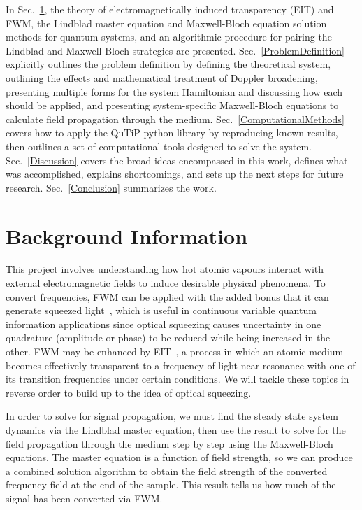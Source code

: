 \documentclass[aps,pra,showpacs,amsmath,amssymb,nofootinbib,longbibliography,superscriptaddress
]{revtex4-1}
\theoremstyle{definition}
\theoremstyle{remark}
\newcommand{\0}{\hat{0}}
\begin{document}
In Sec.~\ref{Background}, the theory of electromagnetically induced transparency (EIT) and FWM, the Lindblad master equation and Maxwell-Bloch equation solution methods for quantum systems, and an algorithmic procedure for pairing the Lindblad and Maxwell-Bloch strategies are presented. Sec.~\ref{ProblemDefinition} explicitly outlines the problem definition by defining the theoretical system, outlining the effects and mathematical treatment of Doppler broadening, presenting multiple forms for the system Hamiltonian and discussing how each should be applied, and presenting system-specific Maxwell-Bloch equations to calculate field propagation through the medium. Sec.~\ref{ComputationalMethods} covers how to apply the QuTiP python library by reproducing known results, then outlines a set of computational tools designed to solve the system. Sec.~\ref{Discussion} covers the broad ideas encompassed in this work, defines what was accomplished, explains shortcomings, and sets up the next steps for future research. Sec.~\ref{Conclusion} summarizes the work.


\section{Background Information}\label{Background}

This project involves understanding how hot atomic vapours interact with external electromagnetic fields to induce desirable physical phenomena. To convert frequencies, FWM can be applied with the added bonus that it can generate squeezed light~\cite{Slusher}, which is useful in continuous variable quantum information applications since optical squeezing causes uncertainty in one quadrature (amplitude or phase) to be reduced while being increased in the other. FWM may be enhanced by EIT~\cite{Xiao}, a process in which an atomic medium becomes effectively transparent to a frequency of light near-resonance with one of its transition frequencies under certain conditions. We will tackle these topics in reverse order to build up to the idea of optical squeezing.

In order to solve for signal propagation, we must find the steady state system dynamics via the Lindblad master equation, then use the result to solve for the field propagation through the medium step by step using the Maxwell-Bloch equations. The master equation is a function of field strength, so we can produce a combined solution algorithm to obtain the field strength of the converted frequency field at the end of the sample. This result tells us how much of the signal has been converted via FWM.
\end{document}
